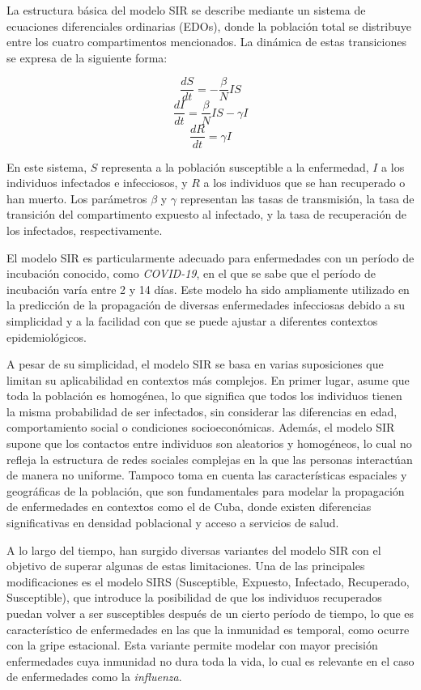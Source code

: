 La estructura básica del modelo SIR se describe mediante un sistema de ecuaciones diferenciales ordinarias (EDOs), donde la población total se distribuye entre los cuatro compartimentos mencionados. La dinámica de estas transiciones se expresa de la siguiente forma:

\[
\frac{dS}{dt} = - \frac{\beta}{N}IS
\]
\[
\frac{dI}{dt} = \frac{\beta}{N}IS - \gamma I
\]
\[
\frac{dR}{dt} = \gamma I
\]

En este sistema, \(S\) representa a la población susceptible a la enfermedad, \(I\) a los individuos infectados e infecciosos, y \(R\) a los individuos que se han recuperado o han muerto. Los parámetros \(\beta\) y \(\gamma\) representan las tasas de transmisión, la tasa de transición del compartimento expuesto al infectado, y la tasa de recuperación de los infectados, respectivamente.

El modelo SIR es particularmente adecuado para enfermedades con un período de incubación conocido, como \textit{COVID-19}\parencite{Burke2024OriginsSEIR}, en el que se sabe que el período de incubación varía entre 2 y 14 días. Este modelo ha sido ampliamente utilizado en la predicción de la propagación de diversas enfermedades infecciosas debido a su simplicidad y a la facilidad con que se puede ajustar a diferentes contextos epidemiológicos.

A pesar de su simplicidad, el modelo SIR se basa en varias suposiciones que limitan su aplicabilidad en contextos más complejos\parencite{Chowell2016EarlyGrowth}. En primer lugar, asume que toda la población es homogénea, lo que significa que todos los individuos tienen la misma probabilidad de ser infectados, sin considerar las diferencias en edad, comportamiento social o condiciones socioeconómicas. Además, el modelo SIR supone que los contactos entre individuos son aleatorios y homogéneos, lo cual no refleja la estructura de redes sociales complejas en la que las personas interactúan de manera no uniforme\parencite{Moein2021SIRInefficiency}. Tampoco toma en cuenta las características espaciales y geográficas de la población, que son fundamentales para modelar la propagación de enfermedades en contextos como el de Cuba, donde existen diferencias significativas en densidad poblacional y acceso a servicios de salud\parencite{Nowzari2016ComplexNetworks}.

A lo largo del tiempo, han surgido diversas variantes del modelo SIR con el objetivo de superar algunas de estas limitaciones. Una de las principales modificaciones es el modelo SIRS (Susceptible, Expuesto, Infectado, Recuperado, Susceptible), que introduce la posibilidad de que los individuos recuperados puedan volver a ser susceptibles después de un cierto período de tiempo, lo que es característico de enfermedades en las que la inmunidad es temporal, como ocurre con la gripe estacional\parencite{Mata2021MathematicalEpidemics}. Esta variante permite modelar con mayor precisión enfermedades cuya inmunidad no dura toda la vida, lo cual es relevante en el caso de enfermedades como la \textit{influenza}.

